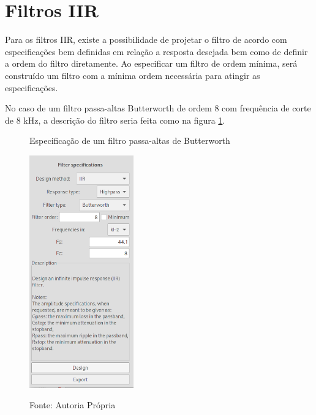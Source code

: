 \documentclass[12pt,a4paper]{report}
\begin{document}
\section{Filtros IIR}
  Para os filtros IIR, existe a possibilidade de projetar o filtro de acordo com especificações bem definidas
  em relação a resposta desejada bem como de definir a ordem do filtro diretamente. Ao especificar um filtro de
  ordem mínima, será construído um filtro com a mínima ordem necessária para atingir as especificações.

  No caso de um filtro passa-altas Butterworth de ordem 8 com frequência de corte de 8 kHz, a descrição do 
  filtro seria feita como na figura \ref{fig:butter_specifications}.
  \begin{figure}[H]
    \caption{Especificação de um filtro passa-altas de Butterworth}
    \centering
    \includegraphics[width=0.4\textwidth]{images/butter_specifications}
    \label{fig:butter_specifications}
    \caption*{Fonte: Autoria Própria}
  \end{figure}
\end{document}

